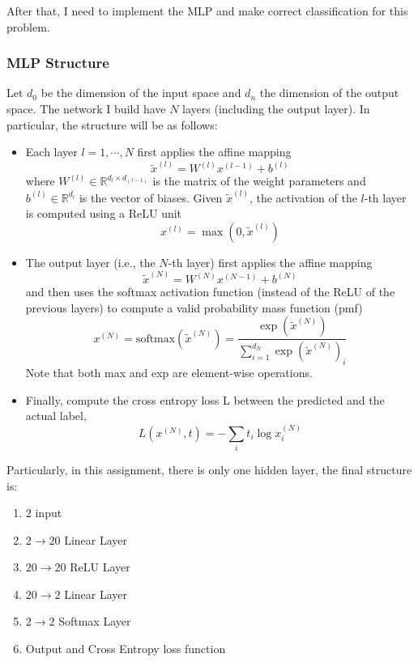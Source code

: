 \documentclass{article}
\begin{document}
After that, I need to implement the MLP and make correct classification for this problem.

\subsubsection{MLP Structure}

Let $d_{0}$ be the dimension of the input space and $d_{n}$ the dimension of the output space. The network I build have $N$ layers (including the output layer). In particular, the structure will be as follows:

\begin{itemize}
    \item Each layer $l = 1, \cdots , N$ first applies the affine mapping
    $$
        \tilde{x}^{(l)} = W^{(l)}x^{(l-1)}+b^{(l)}
    $$
    where $W^{(l)} \in \mathbb{R}^{d_{l}\times d_{(l-1)}}$ is the matrix of the weight parameters and $b^{(l)} \in \mathbb{R}^{d_{l}}$ is the vector of biases. Given $\tilde{x}^{(l)}$, the activation of the $l$-th layer is computed using a ReLU unit
        $$        
            x^{(l)} = \max(0,\tilde{x}^{(l)})
        $$
    \item The output layer (i.e., the $N$-th layer) first applies the affine mapping
        $$
            \tilde{x}^{(N)} = W^{(N)}x^{(N-1)} + b^{(N)}
        $$
    and then uses the softmax activation function (instead of the ReLU of the previous layers) to compute a valid probability mass function (pmf)
        $$
            x^{(N)} = \text{softmax}(\tilde{x}^{(N)}) = \frac{\exp(\tilde{x}^{(N)})}{\sum_{i=1}^{d_{N}}\exp(\tilde{x}^{(N)})_{i}}
        $$
    Note that both max and exp are element-wise operations.
    \item Finally, compute the cross entropy loss L between the predicted and the actual label,
        $$
            L(x^{(N)},t) = -\sum_{i}t_{i}\log{x_{i}^{(N)}}    
        $$
\end{itemize}

Particularly, in this assignment, there is only one hidden layer, the final structure is:

\begin{enumerate}
    \item $2$ input
    \item $2 \rightarrow 20$ Linear Layer
    \item $20 \rightarrow 20$ ReLU Layer
    \item $20 \rightarrow 2$ Linear Layer
    \item $2 \rightarrow 2$ Softmax Layer
    \item Output and Cross Entropy loss function
\end{enumerate}
\end{document}
